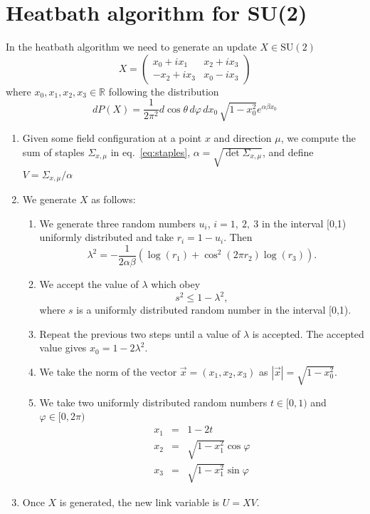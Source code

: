 \documentclass[12pt,a4paper]{article}
\begin{document}
\section*{Heatbath algorithm for SU(2)}
In the heatbath algorithm we need to generate an update $X\in\text{SU}(2)$
	 \begin{equation}
	 	X = \begin{pmatrix}
	 		 x_0 + ix_1 & x_2 + ix_3 \\
	 		-x_2 + ix_3 & x_0 - ix_3
	 	\end{pmatrix}
	 \end{equation}
	 where $x_0, x_1, x_2,x_3 \in \mathbb{R}$
 following the distribution
\begin{equation}
	dP(X) = \frac{1}{2\pi^2} d\cos\theta\, d\varphi\, dx_0\, \sqrt{1-x_0^2}e^{\alpha\beta x_0}
\end{equation}
\begin{enumerate}
\item Given some field configuration at a point $x$ and direction $\mu$, we compute the sum of staples $\Sigma_{x,\mu}$ in eq.\ \eqref{eq:staples}, $\alpha = \sqrt{\det \Sigma_{x,\mu}}$, and define $V = \Sigma_{x,\mu}/\alpha$
	\item We generate $X$ as follows:
	\begin{enumerate}
	\item	We generate three random numbers $u_i$, $i = 1,\ 2,\ 3$ in the interval [0,1) uniformly distributed and take $r_i = 1 - u_i$. Then
		 \begin{equation}
		 	\lambda^2 = -\frac{1}{2\alpha\beta}\left(\log(r_1) + \cos^2(2\pi r_2)\log(r_3)\right).
		 \end{equation}
	\item We accept the value of $\lambda$ which obey
		\begin{equation}
			s^2 \leq 1- \lambda^2,
		\end{equation}
		where $s$ is a uniformly distributed random number in the interval [0,1).
	\item Repeat the previous two steps until a value of $\lambda$ is accepted. The accepted value gives $x_0 = 1 - 2\lambda^2$.
	\item We take the norm of the vector $\vec{x} = (x_1,x_2,x_3)$ as $|\vec{x}| = \sqrt{1 - x_0^2}$.
	\item We take two uniformly distributed random numbers $t \in [0,1)$ and $\varphi\in [0,2\pi)$ 
	\begin{eqnarray}
		x_1 & = & 1 - 2 t \\
		x_2 & = & \sqrt{1 - x_1^2} \cos\varphi \\
		x_3 & = & \sqrt{1 - x_1^2} \sin\varphi	
	\end{eqnarray}		
	  
	\end{enumerate}
	\item Once $X$ is generated, the new link variable is $U = X V$.
\end{enumerate}
\end{document}
